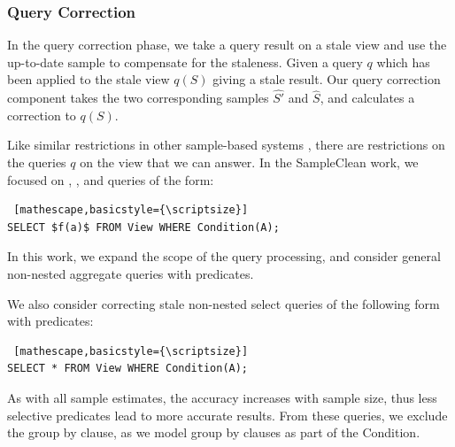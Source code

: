 \subsubsection{Query Correction}
In the query correction phase, we take a query result on a stale view and use the up-to-date sample to compensate for the staleness.
Given a query $q$ which has been applied to the stale view $q(S)$ giving a stale result.
Our query correction component takes the two corresponding samples $\hat{S'}$ and $\hat{S}$, and calculates a correction to $q(S)$.

Like similar restrictions in other sample-based systems \cite{agarwalknowing}, there are restrictions on the queries $q$ on the view that we can answer. 
In the SampleClean work, we focused on \sumfunc, \countfunc, and \avgfunc queries of the form: 
\begin{lstlisting} [mathescape,basicstyle={\scriptsize}]
SELECT $f(a)$ FROM View WHERE Condition(A);
\end{lstlisting}
In this work, we expand the scope of the query processing, and consider general non-nested aggregate queries with predicates.

We also consider correcting stale non-nested select queries of the following form with predicates:
\begin{lstlisting} [mathescape,basicstyle={\scriptsize}]
SELECT * FROM View WHERE Condition(A);
\end{lstlisting}
As with all sample estimates, the accuracy increases with sample size, thus less selective predicates lead to more accurate results.
From these queries, we exclude the group by clause, as we model group by clauses as part of the \textsf{Condition}.

